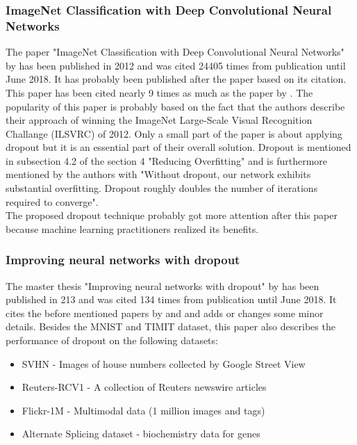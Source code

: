 \documentclass[a4paper]{article}
\begin{document}
\subsubsection{ImageNet Classification with Deep Convolutional Neural Networks}

The paper "ImageNet Classification with Deep Convolutional Neural Networks" by \cite{NIPS2012_4824} has been published in 2012 and was cited 24405 times from publication until June 2018. It has probably been published after the paper \cite{DBLP:journals/corr/abs-1207-0580} based on its citation. This paper has been cited nearly 9 times as much as the paper by \cite{DBLP:journals/corr/abs-1207-0580}. The popularity of this paper is probably based on the fact that the authors describe their approach of winning the ImageNet Large-Scale Visual Recognition Challange (ILSVRC) of 2012. Only a small part of the paper is about applying dropout but it is an essential part of their overall solution. Dropout is mentioned in subsection 4.2 of the section 4 "Reducing Overfitting" and is furthermore mentioned by the authors with "Without dropout, our network exhibits substantial overfitting. Dropout roughly doubles the number of iterations required to converge".\\
The proposed dropout technique probably got more attention after this paper because machine learning practitioners realized its benefits.


\subsubsection{Improving neural networks with dropout}

The master thesis "Improving neural networks with dropout" by \cite{Srivastava_improvingneural} has been published in 213 and was cited 134 times from publication until June 2018. It cites the before mentioned papers by \cite{DBLP:journals/corr/abs-1207-0580} and \cite{NIPS2012_4824} and adds or changes some minor details. Besides the MNIST and TIMIT dataset, this paper also describes the performance of dropout on the following datasets:

\begin{itemize}
	\item SVHN - Images of house numbers collected by Google Street View
	\item Reuters-RCV1 - A collection of Reuters newswire articles
	\item Flickr-1M - Multimodal data (1 million images and tags)
	\item Alternate Splicing dataset - biochemistry data for genes
\end{itemize}
\end{document}
